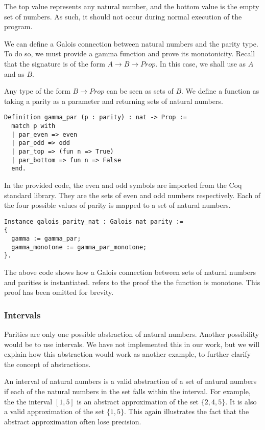 The top value represents any natural number, and the bottom value is the empty
set of numbers. As such, it should not occur during normal execution of the 
program.

We can define a Galois connection between natural numbers and the parity type.
To do so, we must provide a gamma function and prove its monotonicity. Recall
that the signature is of the form $A \rightarrow B \rightarrow Prop$. In this
case, we shall use  as $A$ and  as $B$.

Any type of the form $B \rightarrow Prop$ can be seen as sets of $B$. We define
a function  as taking a parity as a parameter and returning
sets of natural numbers.

\begin{verbatim}
Definition gamma_par (p : parity) : nat -> Prop :=
  match p with
  | par_even => even 
  | par_odd => odd 
  | par_top => (fun n => True)
  | par_bottom => fun n => False
  end.
\end{verbatim}

In the provided code, the even and odd symbols are imported from the Coq
standard library. They are the sets of even and odd numbers respectively. Each
of the four possible values of parity is mapped to a set of natural numbers.

\begin{verbatim}
Instance galois_parity_nat : Galois nat parity :=
{
  gamma := gamma_par;
  gamma_monotone := gamma_par_monotone;
}.
\end{verbatim}

The above code shows how a Galois connection between sets of natural numbers 
and parities is instantiated.  refers to the proof the
the  function is monotone. This proof has been omitted for 
brevity.

\subsubsection{Intervals}
Parities are only one possible abstraction of natural numbers. Another
possibility would be to use intervals. We have not implemented this in our
work, but we will explain how this abstraction would work as another example,
to further clarify the concept of abstractions.

An interval of natural numbers is a valid abstraction of a set of natural
numbers if each of the natural numbers in the set falls within the interval.
For example, the the interval $[1,5]$ is an abstract approximation of the set
$\{2, 4, 5\}$. It is also a valid approximation of the set $\{1,5\}$. This
again illustrates the fact that the abstract approximation often lose 
precision.

